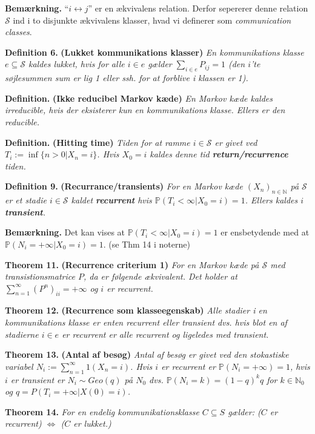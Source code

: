 \documentclass[a4paper,12pt,openany]{book}
\begin{document}
\textbf{Bemærkning.} ``\(i\longleftrightarrow j\)'' er en ækvivalens relation. Derfor sepererer denne relation \(\mathcal{S}\) ind i to disjunkte ækvivalens klasser, hvad vi definerer som \emph{communication classes}.

\textbf{Definition 6.} \textbf{(Lukket kommunikations klasser)} \emph{En kommunikations klasse \(e\subseteq \mathcal{S}\) kaldes lukket, hvis for alle \(i\in e\) gælder \(\sum_{i\in e}P_{ij}=1\) (den \(i\)'te søjlesummen sum er lig 1 eller ssh. for at forblive i klassen er 1).}

\textbf{Definition.} \textbf{(Ikke reducibel Markov kæde)} \emph{En Markov kæde kaldes irreducible, hvis der eksisterer kun en kommunikations klasse. Ellers er den reducible.}

\textbf{Definition.} \textbf{(Hitting time)} \emph{Tiden for at ramme \(i\in \mathcal{S}\) er givet ved \(T_i:=\inf\{n>0 \vert X_n=i\}\). Hvis \(X_0=i\) kaldes denne tid \textbf{return/recurrence} tiden.}

\textbf{Definition 9.} \textbf{(Recurrance/transients)} \emph{For en Markov kæde \((X_n)_{n\in\mathbb{N}}\) på \(\mathcal{S}\) er et stadie \(i\in\mathcal{S}\) kaldet \textbf{recurrent} hvis \(\mathbb{P}(T_i<\infty \vert X_0=i)=1\). Ellers kaldes \(i\) \textbf{transient}.}

\textbf{Bemærkning.} Det kan vises at \(\mathbb{P}(T_i<\infty \vert X_0=i)=1\) er ensbetydende med at \(\mathbb{P}(N_i=+\infty \vert X_0=i)=1\). (se Thm 14 i noterne)

\textbf{Theorem 11.} \textbf{(Recurrence criterium 1)} \emph{For en Markov kæde på \(\mathcal{S}\) med transistionsmatrice \(P\), da er følgende ækvivalent. Det holder at \(\sum_{n=1}^\infty (P^n)_{ii}=+\infty\) og \(i\) er recurrent.}

\textbf{Theorem 12.} \textbf{(Recurrence som klasseegenskab)} \emph{Alle stadier i en kommunikations klasse er enten recurrent eller transient dvs. hvis blot en af stadierne \(i\in e\) er recurrent er alle recurrent og ligeledes med transient.}

\textbf{Theorem 13.} \textbf{(Antal af besøg)} \emph{Antal af besøg er givet ved den stokastiske variabel \(N_i:=\sum_{n=1}^\infty 1(X_n=i)\). Hvis \(i\) er recurrent er \(\mathbb{P}(N_i=+\infty)=1\), hvis \(i\) er transient er \(N_i\sim Geo(q)\) på \(N_0\) dvs. \(\mathbb{P}(N_i=k)=(1-q)^kq\) for \(k\in\mathbb{N}_0\) og \(q=P(T_i=+\infty\vert X(0)=i)\).}

\textbf{Theorem 14.} \emph{For en endelig kommunikationsklasse \(C\subseteq S\) gælder: (\(C\) er recurrent) \(\Leftrightarrow\) (\(C\) er lukket.)}
\end{document}
